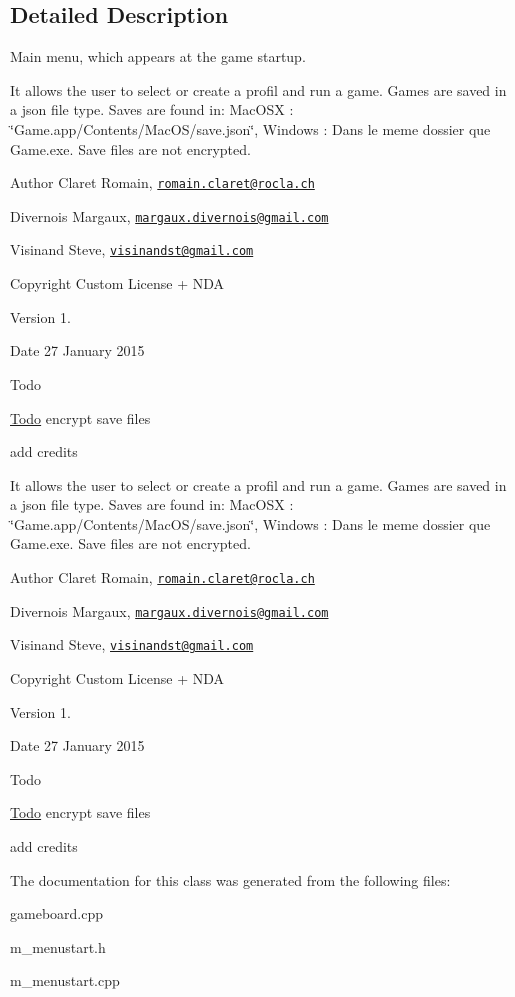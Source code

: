 \subsection{Detailed Description}
Main menu, which appears at the game startup. 

It allows the user to select or create a profil and run a game. Games are saved in a json file type. Saves are found in\+: Mac\+O\+S\+X \+: \char`\"{}\+Game.\+app/\+Contents/\+Mac\+O\+S/save.\+json\char`\"{}, Windows \+: Dans le meme dossier que Game.\+exe. Save files are not encrypted. \begin{DoxyAuthor}{Author}
Claret Romain, \href{mailto:romain.claret@rocla.ch}{\tt romain.\+claret@rocla.\+ch} 

Divernois Margaux, \href{mailto:margaux.divernois@gmail.com}{\tt margaux.\+divernois@gmail.\+com} 

Visinand Steve, \href{mailto:visinandst@gmail.com}{\tt visinandst@gmail.\+com} 
\end{DoxyAuthor}
\begin{DoxyCopyright}{Copyright}
Custom License + N\+D\+A 
\end{DoxyCopyright}
\begin{DoxyVersion}{Version}
1. 
\end{DoxyVersion}
\begin{DoxyDate}{Date}
27 January 2015 
\end{DoxyDate}
\begin{DoxyRefDesc}{Todo}
\item[\hyperlink{todo__todo000013}{Todo}]encrypt save files 

add credits \end{DoxyRefDesc}


It allows the user to select or create a profil and run a game. Games are saved in a json file type. Saves are found in\+: Mac\+O\+S\+X \+: \char`\"{}\+Game.\+app/\+Contents/\+Mac\+O\+S/save.\+json\char`\"{}, Windows \+: Dans le meme dossier que Game.\+exe. Save files are not encrypted. \begin{DoxyAuthor}{Author}
Claret Romain, \href{mailto:romain.claret@rocla.ch}{\tt romain.\+claret@rocla.\+ch} 

Divernois Margaux, \href{mailto:margaux.divernois@gmail.com}{\tt margaux.\+divernois@gmail.\+com} 

Visinand Steve, \href{mailto:visinandst@gmail.com}{\tt visinandst@gmail.\+com} 
\end{DoxyAuthor}
\begin{DoxyCopyright}{Copyright}
Custom License + N\+D\+A 
\end{DoxyCopyright}
\begin{DoxyVersion}{Version}
1. 
\end{DoxyVersion}
\begin{DoxyDate}{Date}
27 January 2015 
\end{DoxyDate}
\begin{DoxyRefDesc}{Todo}
\item[\hyperlink{todo__todo000027}{Todo}]encrypt save files 

add credits \end{DoxyRefDesc}


The documentation for this class was generated from the following files\+:\begin{DoxyCompactItemize}
\item 
gameboard.\+cpp\item 
m\+\_\+menustart.\+h\item 
m\+\_\+menustart.\+cpp\end{DoxyCompactItemize}
